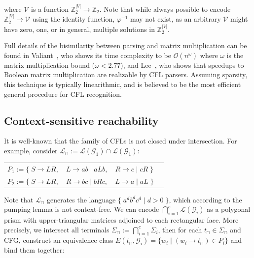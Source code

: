 \documentclass[sigplan,nonacm]{acmart}\settopmatter{printfolios=false,printccs=false,printacmref=false}
\begin{document}
\noindent where $\mathcal{V}$ is a function $\mathbb{Z}_2^{|V|}\rightarrow\mathbb{Z}_2$. Note that while always possible to encode $\mathbb{Z}_2^{|V|} \rightarrow \mathcal{V}$ using the identity function, $\varphi^{-1}$ may not exist, as an arbitrary $\mathcal{V}$ might have zero, one, or in general, multiple solutions in $\mathbb{Z}_2^{|V|}$.

Full details of the bisimilarity between parsing and matrix multiplication can be found in Valiant~\cite{valiant1975general}, who shows its time complexity to be $\mathcal{O}(n^\omega)$ where $\omega$ is the matrix multiplication bound ($\omega < 2.77$), and Lee~\cite{lee2002fast}, who shows that speedups to Boolean matrix multiplication are realizable by CFL parsers. Assuming sparsity, this technique is typically linearithmic, and is believed to be the most efficient general procedure for CFL recognition.

\subsection{Context-sensitive reachability}

It is well-known that the family of CFLs is not closed under intersection. For example, consider $\mathcal{L}_\cap := \mathcal{L}(\mathcal{G}_1) \cap \mathcal{L}(\mathcal{G}_1)$:

\begin{table}[H]
    \begin{tabular}{llll}
        $P_1 := \big\{\;S \rightarrow L R,$ & $L \rightarrow a b \mid a L b,$ & $R \rightarrow c \mid c R\;\big\}$\vspace{5pt}\\
        $P_2 := \big\{\;S \rightarrow L R,$ & $R \rightarrow b c \mid b R c,$ & $L \rightarrow a \mid a L\;\big\}$
    \end{tabular}
\end{table}

\noindent Note that $\mathcal{L}_\cap$ generates the language $\big\{\;a^d b^d c^d \mid d > 0\;\big\}$, which according to the pumping lemma is not context-free. We can encode $\bigcap_{i=1}^c \mathcal{L}(\mathcal{G}_i)$ as a polygonal prism with upper-triangular matrices adjoined to each rectangular face. More precisely, we intersect all terminals $\Sigma_\cap := \bigcap_{i=1}^c \Sigma_i$, then for each $t_\cap \in \Sigma_\cap$ and CFG, construct an equivalence class $E(t_\cap, \mathcal{G}_i) = \{ w_i \mid (w_i \rightarrow t_\cap) \in P_i\}$ and bind them together:\vspace{-5pt}
\end{document}
